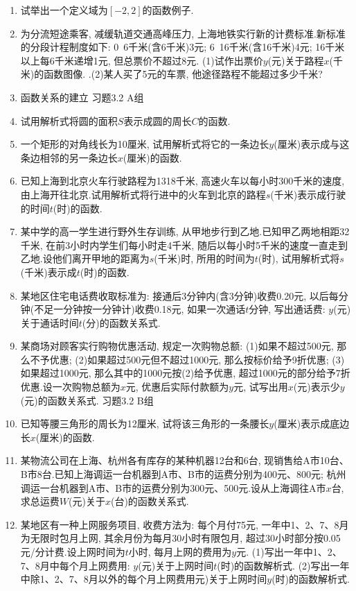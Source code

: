 \documentclass[10pt,a4paper]{article}
\begin{document}
\begin{enumerate}[1.]
\item 试举出一个定义域为$[-2,2]$的函数例子.
\item 为分流短途乘客, 减缓轨道交通高峰压力, 上海地铁实行新的计费标准.新标准的分段计程制度如下: 0~6千米(含6千米)3元; 6~16千米(含16千米)4元; 16千米以上每6千米递增1元, 但总票价不超过8元.
(1)试作出票价$y$(元)关于路程$x$(千米)的函数图像.
.(2)某人买了5元的车票, 他途径路程不能超过多少千米?
\item 函数关系的建立
习题3.2  A组
\item 试用解析式将圆的面积$S$表示成圆的周长$C$的函数.
\item 一个矩形的对角线长为10厘米, 试用解析式将它的一条边长$y$(厘米)表示成与这条边相邻的另一条边长$x$(厘米)的函数.
\item 已知上海到北京火车行驶路程为1318千米, 高速火车以每小时300千米的速度, 由上海开往北京.试用解析式将行进中的火车到北京的路程$s$(千米)表示成行驶的时间$t$(时)的函数.
\item 某中学的高一学生进行野外生存训练, 从甲地步行到乙地.已知甲乙两地相距32千米, 在前3小时内学生们每小时走4千米, 随后以每小时5千米的速度一直走到乙地.设他们离开甲地的距离为$s$(千米)时, 所用的时间为$t$(时), 试用解析式将$s$(千米)表示成$t$(时)的函数.
\item 某地区住宅电话费收取标准为: 接通后3分钟内(含3分钟)收费0.20元, 以后每分钟(不足一分钟按一分钟计)收费0.18元, 如果一次通话$t$分钟, 写出通话费: $y$(元)关于通话时间$t$(分)的函数关系式.
\item 某商场对顾客实行购物优惠活动, 规定一次购物总额: (1)如果不超过500元, 那么不予优惠; (2)如果超过500元但不超过1000元, 那么按标价给予9折优惠; (3)如果超过1000元, 那么其中的1000元按(2)给予优惠, 超过1000元的部分给予7折优惠.设一次购物总额为$x$元, 优惠后实际付款额为$y$元, 试写出用$x$(元)表示少$y$(元)的函数关系式.
习题3.2  B组
\item 已知等腰三角形的周长为12厘米, 试将该三角形的一条腰长$y$(厘米)表示成底边长$x$(厘米)的函数.
\item 某物流公司在上海、杭州各有库存的某种机器12台和6台, 现销售给A市10台、B市8台.已知上海调运一台机器到A市、B市的运费分别为400元、800元; 杭州调运一台机器到A市、B市的运费分别为300元、500元.设从上海调往A市$x$台, 求总运费$W$(元)关于$x$(台)的函数关系式.
\item 某地区有一种上网服务项目, 收费方法为: 每个月付75元, 一年中1、2、7、8月为无限时包月上网, 其余月份为每月30小时有限包月, 超过30小时部分按0.05元/分计费.设上网时间为$t$小时, 每月上网的费用为$y$元.
(1)写出一年中1、2、7、8月中每个月上网费用: $y$(元)关于上网时间$t$(时)的函数解析式.
(2)写出一年中除1、2、7、8月以外的每个月上网费用元)关于上网时间$y$(时)的函数解析式.

\end{enumerate}
\end{document}
